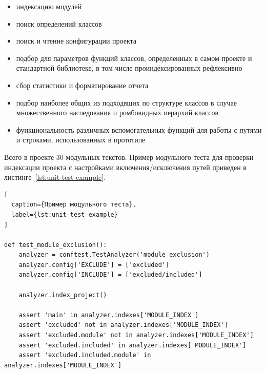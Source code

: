 \begin{itemize}
    \item индексацию модулей
    \item поиск определений классов
    \item поиск и чтение конфигурации проекта
    \item подбор для параметров функций классов, определенных в самом проекте и
      стандартной библиотеке, в том числе проиндексированных рефлексивно
    \item сбор статистики и форматирование отчета
    \item подбор наиболее общих из подходящих по структуре классов в случае
      множественного наследования и ромбовидных иерархий классов
    \item функциональность различных вспомогательных функций для работы с
      путями и строками, использованных в прототипе
\end{itemize}

Всего в проекте 30 модульных текстов. Пример модульного теста для проверки
индексации проекта с настройками включения/исключения путей приведен в
листинге~\ref{lst:unit-test-example}.

\begin{lstlisting}[
  caption={Пример модульного теста},
  label={lst:unit-test-example}
]

def test_module_exclusion():
    analyzer = conftest.TestAnalyzer('module_exclusion')
    analyzer.config['EXCLUDE'] = ['excluded']
    analyzer.config['INCLUDE'] = ['excluded/included']

    analyzer.index_project()

    assert 'main' in analyzer.indexes['MODULE_INDEX']
    assert 'excluded' not in analyzer.indexes['MODULE_INDEX']
    assert 'excluded.module' not in analyzer.indexes['MODULE_INDEX']
    assert 'excluded.included' in analyzer.indexes['MODULE_INDEX']
    assert 'excluded.included.module' in analyzer.indexes['MODULE_INDEX']

\end{lstlisting}
